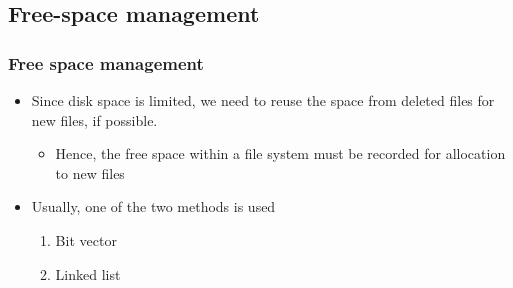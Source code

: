 \documentclass[CJKutf8,xcolor=pdftex,dvipsnames,table]{beamer}
\begin{document}
\begin{CJK*}{UTF8}{song}
  \subsection{Free-space management}

  \begin{frame}
    \frametitle{Free space management} \pause
    \begin{itemize}\parskip=0pt
    \item Since disk space is limited, we need to reuse the space from deleted files for new files, if possible. \pause
      \begin{itemize}\parskip=0pt
      \item Hence, the free space within a file system must be recorded for allocation to new files \pause
      \end{itemize}
    \item Usually, one of the two methods is used \pause
      \begin{enumerate}\parskip=0pt
      \item Bit vector \pause
      \item Linked list
      \end{enumerate}
    \end{itemize}
  \end{frame}
  

\end{CJK*}
\end{document}
